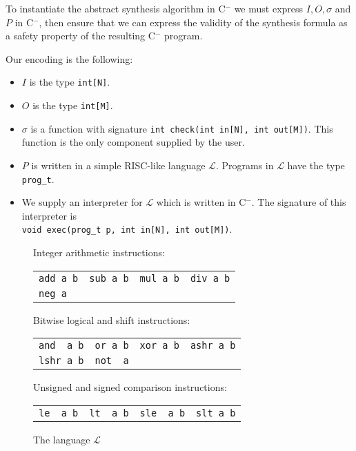 \documentclass[a4paper]{llncs}
\newcommand{\newC}{C$^-$\xspace}
\begin{document}
To instantiate the abstract synthesis algorithm in \newC we must express $I, O,
\sigma$ and $P$ in \newC, then ensure that we can express the validity of the
synthesis formula as a safety property of the resulting \newC program.

Our encoding is the following:
%
\begin{itemize}
 \item $I$ is the type \verb|int[N]|.
 \item $O$ is the type \verb|int[M]|.
 \item $\sigma$ is a function with signature
 \verb|int check(int in[N], int out[M])|. This function is the only component supplied
 by the user.
 \item $P$ is written in a simple RISC-like language $\mathcal{L}$.  Programs in $\mathcal{L}$
 have the type \verb|prog_t|.
 \item We supply an interpreter for $\mathcal{L}$ which is written in \newC.  The signature
 of this interpreter is \\
 \verb|void exec(prog_t p, int in[N], int out[M])|.
\end{itemize}

\begin{figure}
\begin{center}
\setlength{\tabcolsep}{16pt}
Integer arithmetic instructions:

\begin{tabular}{llll}
 \verb|add a b| & \verb|sub a b| & \verb|mul a b| & \verb|div a b| \\
 \verb|neg a| & & &
\end{tabular}

\medskip

Bitwise logical and shift instructions:

\begin{tabular}{llll}
 \verb|and  a b| & \verb|or a b| & \verb|xor a b| & \verb|ashr a b| \\
 \verb|lshr a b| & \verb|not  a| & &
\end{tabular}

\medskip

Unsigned and signed comparison instructions:

\begin{tabular}{llll}
 \verb|le  a b| & \verb|lt  a b| & \verb|sle  a b| & \verb|slt a b|
\end{tabular}
\end{center}

 \caption{The language $\mathcal{L}$}
 \label{fig:l-language}

\end{figure}
\end{document}
